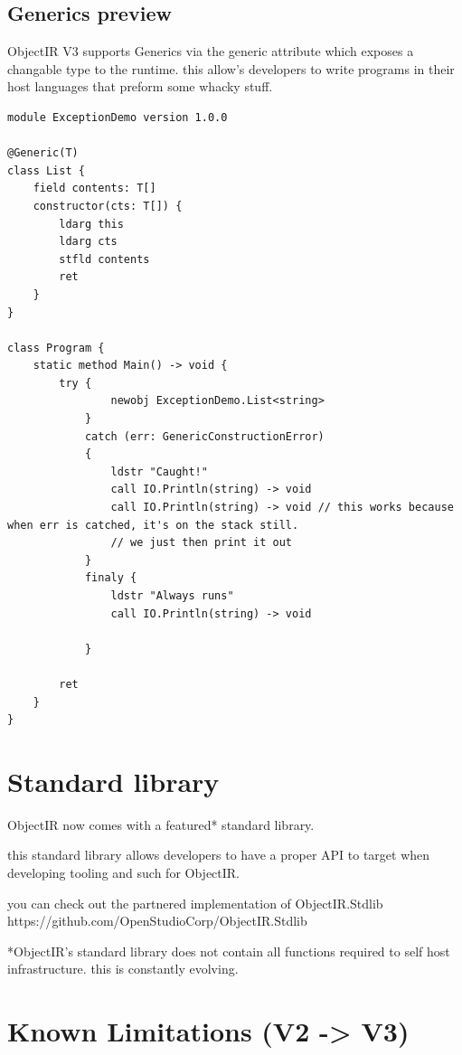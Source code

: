 \documentclass[11pt,a4paper]{article}
\begin{document}
\subsection{Generics preview}
ObjectIR V3 supports Generics via the generic attribute which exposes a changable type to the runtime.
this allow's developers to write programs in their host languages that preform some whacky stuff.

\begin{lstlisting}[style=textir, caption={generics example}]
module ExceptionDemo version 1.0.0

@Generic(T)
class List {
    field contents: T[]
    constructor(cts: T[]) {
        ldarg this
        ldarg cts
        stfld contents
        ret
    }
}

class Program {
    static method Main() -> void {
        try {
            	newobj ExceptionDemo.List<string>
            }
            catch (err: GenericConstructionError)
            {
            	ldstr "Caught!"
            	call IO.Println(string) -> void
            	call IO.Println(string) -> void // this works because when err is catched, it's on the stack still.
            	// we just then print it out
            }
            finaly {
            	ldstr "Always runs"
            	call IO.Println(string) -> void
            	
            }
     
        ret
    }
}
\end{lstlisting}

\section{Standard library}
\label{sec:stdlib}
ObjectIR now comes with a featured* standard library.

this standard library allows developers to have a proper API to target when developing tooling and such for ObjectIR.

you can check out the partnered implementation of ObjectIR.Stdlib
https://github.com/OpenStudioCorp/ObjectIR.Stdlib

*ObjectIR's standard library does not contain all functions required to 
self host infrastructure. this is constantly evolving.

\section{Known Limitations (V2 -> V3)}
\label{sec:limits}
\end{document}
